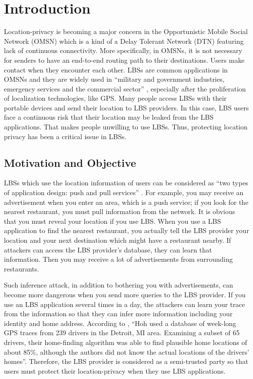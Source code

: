 \chapter {Introduction}
\label{INTRO}
\noindent Location-privacy is becoming a major concern in the Opportunistic Mobile Social Network (OMSN) which is a kind of a Delay Tolerant Network (DTN) \cite {C1} featuring lack of continuous connectivity. More specifically, in OMSNs, it is not necessary for senders to have an end-to-end routing path to their destinations. Users make contact when they encounter each other. LBSs are common applications in OMSNs and they are widely used in ``military and government industries, emergency services and the commercial sector'' \cite {C4}, especially after the proliferation of localization technologies, like GPS. Many people access LBSs with their portable devices and send their location to LBS providers. In this case, LBS users face a continuous risk that their location may be leaked from the LBS applications. That makes people unwilling to use LBSs. Thus, protecting location privacy has been a critical issue in LBSs.


\section{ Motivation and Objective}

\noindent LBSs which use the location information of users can be considered as ``two types of application design: push and pull services'' \cite {C4}. For example, you may receive an advertisement when you enter an area, which is a push service; if you look for the nearest restaurant, you must pull information from the network. It is obvious that you must reveal your location if you use LBS. When you use a LBS application to find the nearest restaurant, you actually tell the LBS provider your location and your next destination which might have a restaurant nearby. If attackers can access the LBS provider's database, they can learn that information. Then you may receive a lot of advertisements from surrounding restaurants.

Such inference attack, in addition to bothering you with advertisements, can become more dangerous when you send more queries to the LBS provider. If you use an LBS application several times in a day, the attackers can learn your trace from the information so that they can infer more information including your identity and home address. According to \cite {C5}, ``Hoh used a database of week-long GPS traces from 239 drivers in the Detroit, MI area. Examining a subset of 65 drivers, their home-finding algorithm was able to find plausible home locations of about 85\%, although the authors did not know the actual locations of the drivers' homes''. Therefore, the LBS provider is considered as a semi-trusted party so that users must protect their location-privacy when they use LBS applications.

